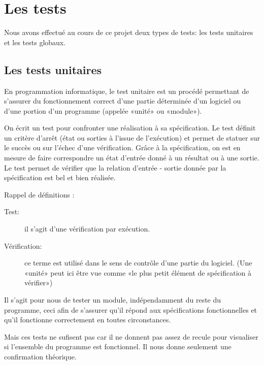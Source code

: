
\section{Les tests}
Nous avons effectué au cours de ce projet deux types de tests: les tests unitaires et les tests globaux.

    \subsection{Les tests unitaires}
En programmation informatique, le test unitaire est un procédé permettant de s'assurer du fonctionnement correct d'une partie déterminée d'un logiciel ou d'une portion d'un programme (appelée «unité» ou «module»).

On écrit un test pour confronter une réalisation à sa spécification. Le test définit un critère d’arrêt (état ou sorties à l’issue de l’exécution) et permet de statuer sur le succès ou sur l’échec d’une vérification. Grâce à la spécification, on est en mesure de faire correspondre un état d’entrée donné à un résultat ou à une sortie. Le test permet de vérifier que la relation d’entrée - sortie donnée par la spécification est bel et bien réalisée.

Rappel de définitions :
\begin{description}
\item[Test:] il s'agit d'une vérification par exécution.
\item[Vérification:] ce terme est utilisé dans le sens de contrôle d'une partie du logiciel. (Une «unité» peut ici être vue comme «le plus petit élément de spécification à vérifier»)
\end{description}

Il s'agit pour nous de tester un module, indépendamment du reste du programme, ceci afin de s'assurer qu'il répond aux spécifications fonctionnelles et qu'il fonctionne correctement en toutes circonstances.

Mais ces tests ne sufisent pas car il ne donnent pas assez de recule pour visualiser si l'ensemble du programme est fonctionnel. Il nous donne seulement une confirmation théorique.

